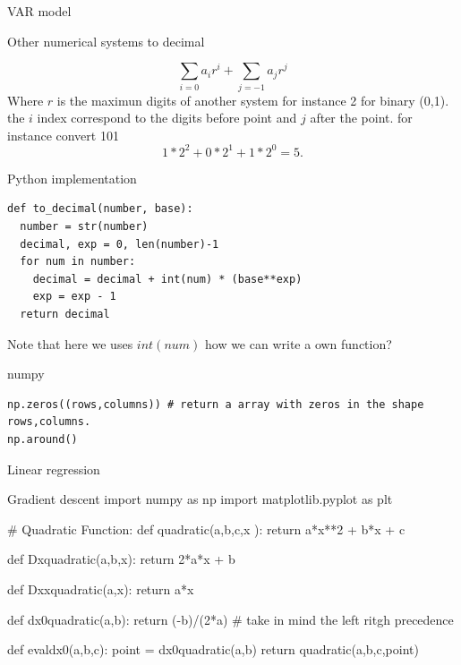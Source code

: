 \documentclass{beamer}
\begin{document}
\begin{frame}{VAR model}

\end{frame}





\begin{frame}{Other numerical systems to decimal}

\begin{equation}
\sum_{i=0}a_{i}r^{i} + \sum_{j=-1}a_{j}r^{j}
\end{equation}
Where $r$ is the maximun digits of another system for instance 2 for binary (0,1).
the $i$ index correspond to the digits before point and $j$ after the point.
for instance convert 101
\begin{equation}
1*2^{2} + 0*2^{1} + 1 *2^{0} = 5.
\end{equation}
\end{frame}


\begin{frame}[fragile]{Python implementation}
\begin{lstlisting}
def to_decimal(number, base):
  number = str(number)
  decimal, exp = 0, len(number)-1
  for num in number:
    decimal = decimal + int(num) * (base**exp)
    exp = exp - 1
  return decimal
\end{lstlisting}
Note that here we uses $int(num)$ how we can write a own function?
\end{frame}

\begin{frame}[fragile]{numpy}
\begin{lstlisting}
np.zeros((rows,columns)) # return a array with zeros in the shape rows,columns.
np.around()
\end{lstlisting}
\end{frame}



\begin{frame}{Linear regression}

\end{frame}

\begin{frame}{Gradient descent}
import numpy as np
import matplotlib.pyplot as plt

# Quadratic Function:
def quadratic(a,b,c,x ):
  return a*x**2 + b*x + c

def Dxquadratic(a,b,x):
  return 2*a*x + b

def Dxxquadratic(a,x):
  return a*x

def dx0quadratic(a,b):
  return (-b)/(2*a)  # take in mind the left ritgh precedence 

def evaldx0(a,b,c):
  point = dx0quadratic(a,b)
  return quadratic(a,b,c,point)


\end{frame}
\end{document}
